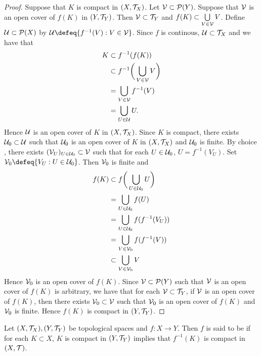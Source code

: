 \documentclass{book}
\begin{document}
\begin{proof}
	Suppose that $K$ is compact in $(X, \mathcal{T}_X)$. Let $\mathcal{V} \subset \mathcal{P}(Y)$. Suppose that $\mathcal{V}$ is an open cover of $f(K)$ in $(Y, \mathcal{T}_Y)$. Then $\mathcal{V} \subset \mathcal{T}_Y$ and $f(K) \subset \bigcup\limits_{V \in \mathcal{V}} V$. Define $\mathcal{U} \subset \mathcal{P}(X)$ by $\MU \defeq \{f^{-1}(V): V \in \MV\}$. Since $f$ is continous, $\mathcal{U} \subset \mathcal{T}_X$ and we have that
	\begin{align*}
		K
		& \subset f^{-1}(f(K)) \\
		& \subset f^{-1} \bigg( \bigcup\limits_{V \in \mathcal{V}} V \bigg) \\
		& = \bigcup\limits_{V \in \mathcal{V}} f^{-1}(V) \\
		& = \bigcup\limits_{U \in \mathcal{U}} U.
	\end{align*}
	Hence $\mathcal{U}$ is an open cover of $K$ in $(X, \mathcal{T}_X)$. Since $K$ is compact, there exists $\mathcal{U}_0 \subset \mathcal{U}$ such that $\mathcal{U}_0$ is an open cover of $K$ in $(X, \mathcal{T}_X)$ and $\mathcal{U}_0$ is finite. By choice , there exists $(\mathcal{V}_U)_{U \in \mathcal{U}_0} \subset \mathcal{V}$ such that for each $U \in \mathcal{U}_0$, $U = f^{-1}(V_U)$. Set $\MV_0 \defeq \{V_U:U \in \MU_0 \}$. Then $\mathcal{V}_0$ is finite and
	\begin{align*}
		f(K)
		& \subset f \bigg( \bigcup\limits_{U \in \mathcal{U}_0} U \bigg) \\
		& = \bigcup\limits_{U \in \mathcal{U}_0} f(U) \\
		& = \bigcup\limits_{U \in \mathcal{U}_0} f(f^{-1}(V_U)) \\
		& = \bigcup\limits_{V \in \mathcal{V}_0} f(f^{-1}(V)) \\
		& \subset \bigcup\limits_{V \in \mathcal{V}_0} V \\
	\end{align*}
	Hence $\mathcal{V}_0$ is an open cover of $f(K)$. Since $\mathcal{V} \subset \mathcal{P}(Y)$ such that $\mathcal{V}$ is an open cover of $f(K)$ is arbitrary, we have that for each $\mathcal{V} \subset \mathcal{T}_Y$, if $\mathcal{V}$ is an open cover of $f(K)$, then there exists $\mathcal{V}_0 \subset \mathcal{V}$ such that $\mathcal{V}_0$ is an open cover of $f(K)$ and $\mathcal{V}_0$ is finite. Hence $f(K)$ is compact in $(Y, \mathcal{T}_Y)$.
\end{proof}
 
 
 \begin{defn}  
 	Let $(X, \mathcal{T}_X), (Y, \mathcal{T}_Y)$ be topological spaces and $f: X \rightarrow Y$. Then $f$ is said to be  if for each $K \subset X$, $K$ is compact in $(Y, \mathcal{T}_Y)$ implies that $f^{-1}(K)$ is compact in $(X, \mathcal{T})$. 
 \end{defn}
\end{document}
